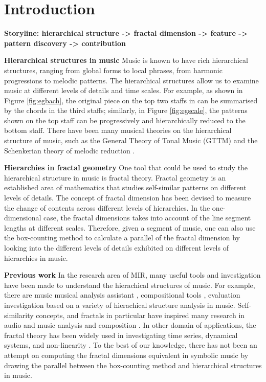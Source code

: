 \section{Introduction}
\label{sec:intro}

\textbf{Storyline: hierarchical structure -> fractal dimension -> feature -> pattern discovery -> contribution }

\textbf{Hierarchical structures in music}
Music is known to have rich hierarchical structures, ranging from global forms to local phrases, from harmonic progressions to melodic patterns. 
The hierarchical structures allow us to examine music at different levels of details and time scales. For example, as shown in Figure \ref{fig:egbach}, the original piece on the top two staffs in can be summarised by the chords in the third staffs; similarly, in Figure \ref{fig:egscale}, the patterns shown on the top staff can be progressively and hierarchically reduced to the bottom staff. 
There have been many musical theories on the hierarchical structure of music, such as the General Theory of Tonal Music (GTTM) \cite{lerdahl1985generative} and the Schenkerian theory of melodic reduction \cite{forte1959schenker}.

\textbf{Hierarchies in fractal geometry}
One tool that could be used to study the hierarchical structure in music is fractal theory.
Fractal geometry is an established area of mathematics that studies self-similar patterns on different levels of details.
The concept of fractal dimension has been devised to measure the change of contents across different levels of hierarchies.
In the one-dimensional case, the fractal dimensions takes into account of the line segment lengths at different scales.
Therefore, given a segment of music, one can also use the box-counting method to calculate a parallel of the fractal dimension by looking into the different levels of details exhibited on different levels of hierarchies in music.

\textbf{Previous work}
In the research area of MIR, many useful tools and investigation have been made to understand the hierachical structures of music.
For example, there are music musical analysis assistant \cite{hamanaka2009interactive, hamanaka2005atta}, compositional tools \cite{hamanaka2004automatic, hamanaka2005automatic}, evaluation investigation \cite{mcfee2017evaluating, mcfee2015hierarchical} based on a variety of hierachical structure analysis in music.
Self-similarity concepts, and fractals in particular have inspired many research in audio and music analysis \cite{bigerelle2000fractal,hsu1990fractal,hsu1991self} and composition \cite{sukumaran2009generation,leach1995nature}.
In other domain of applications, the fractal theory has been widely used in investigating time series, dynamical systems, and non-linearity \cite{accardo1997use, higuchi1988approach}.
To the best of our knowledge, there has not been an attempt on computing the fractal dimensions equivalent in symbolic music by drawing the parallel between the box-counting method and hierarchical structures in music. 

